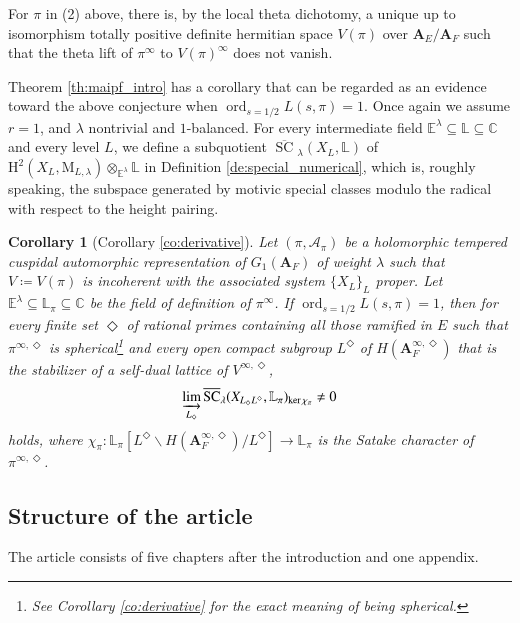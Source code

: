 \documentclass[12pt]{amsart}
\numberwithin{equation}{section}
\theoremstyle{plain}
\newtheorem{corollary}[proposition]{Corollary}
\theoremstyle{definition}
\theoremstyle{remark}
\renewcommand{\b}[1]{\mathbf{#1}}
\renewcommand{\c}[1]{\mathcal{#1}}
\renewcommand{\d}[1]{\mathbb{#1}}
\renewcommand{\r}[1]{\mathrm{#1}}
\renewcommand{\(}{\left(}
\renewcommand{\)}{\right)}
\newcommand{\ol}[1]{\overline{#1}{}}
\newcommand{\bA}{\b A}
\newcommand{\cA}{\c A}
\newcommand{\dC}{\d C}
\newcommand{\dE}{\d E}
\newcommand{\dL}{\d L}
\newcommand{\rH}{\r H}
\newcommand{\rM}{\r M}
\DeclareMathOperator{\Ker}{ker}
\DeclareMathOperator{\ord}{ord}
\DeclareMathOperator{\SC}{SC}
\begin{document}
For $\pi$ in (2) above, there is, by the local theta dichotomy, a unique up to isomorphism totally positive definite hermitian space $V(\pi)$ over $\bA_E/\bA_F$ such that the theta lift of $\pi^\infty$ to $V(\pi)^\infty$ does not vanish.

Theorem \ref{th:maipf_intro} has a corollary that can be regarded as an evidence toward the above conjecture when $\ord_{s=1/2}L(s,\pi)=1$. Once again we assume $r=1$, and $\lambda$ nontrivial and $1$-balanced. For every intermediate field $\dE^\lambda\subseteq\dL\subseteq\dC$ and every level $L$, we define a subquotient $\ol\SC_\lambda(X_L,\dL)$ of $\rH^2(X_L,\rM_{L,\lambda})\otimes_{\dE^\lambda}\dL$ in Definition \ref{de:special_numerical}, which is, roughly speaking, the subspace generated by motivic special classes modulo the radical with respect to the height pairing.


\begin{corollary}[Corollary \ref{co:derivative}]
Let $(\pi,\cA_\pi)$ be a holomorphic tempered cuspidal automorphic representation of $G_1(\bA_F)$ of weight $\lambda$ such that $V\coloneqq V(\pi)$ is incoherent with the associated system $\{X_L\}_L$ proper. Let $\dE^\lambda\subseteq\dL_\pi\subseteq\dC$ be the field of definition of $\pi^\infty$. If $\ord_{s=1/2}L(s,\pi)=1$, then for every finite set $\Diamond$ of rational primes containing all those ramified in $E$ such that $\pi^{\infty,\Diamond}$ is spherical\footnote{See Corollary \ref{co:derivative} for the exact meaning of \emph{being spherical}.} and every open compact subgroup $L^\Diamond$ of $H(\bA^{\infty,\Diamond}_F)$ that is the stabilizer of a self-dual lattice of $V^{\infty,\Diamond}$,
\[
\varinjlim_{L_\Diamond}\ol\SC_\lambda(X_{L_\Diamond L^\Diamond},\dL_{\pi})_{\Ker\chi_\pi}\neq 0
\]
holds, where $\chi_\pi\colon\dL_\pi[L^\Diamond\backslash H(\bA_F^{\infty,\Diamond})/L^\Diamond]\to\dL_\pi$ is the Satake character of $\pi^{\infty,\Diamond}$.
\end{corollary}



\subsection{Structure of the article}


The article consists of five chapters after the introduction and one appendix.
\end{document}
